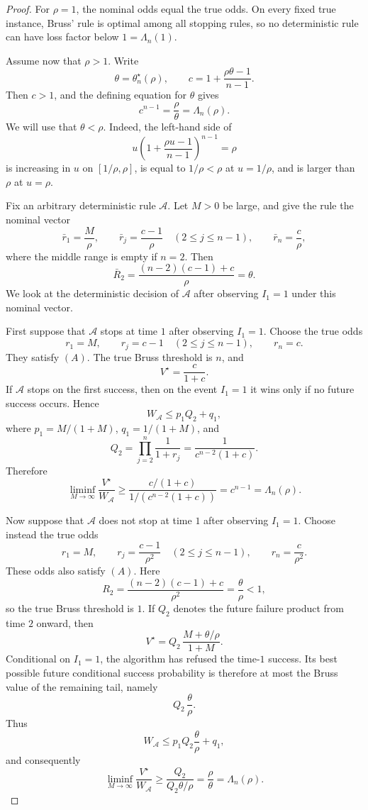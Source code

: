 \documentclass[11pt,a4paper]{article}
\begin{document}
\begin{proof}
For \(\rho=1\), the nominal odds equal the true odds.  On every fixed true
instance, Bruss' rule is optimal among all stopping rules, so no deterministic
rule can have loss factor below \(1=\Lambda_n(1)\).

Assume now that \(\rho>1\).  Write
\[
  \theta=\theta_n^\star(\rho),
  \qquad
  c=1+\frac{\rho\theta-1}{n-1}.
\]
Then \(c>1\), and the defining equation for \(\theta\) gives
\[
  c^{n-1}=\frac{\rho}{\theta}=\Lambda_n(\rho).
\]
We will use that \(\theta<\rho\).  Indeed, the left-hand side of
\[
  u\left(1+\frac{\rho u-1}{n-1}\right)^{n-1}=\rho
\]
is increasing in \(u\) on \([1/\rho,\rho]\), is equal to \(1/\rho<\rho\) at
\(u=1/\rho\), and is larger than \(\rho\) at \(u=\rho\).

Fix an arbitrary deterministic rule \(\mathcal A\).  Let \(M>0\) be large, and
give the rule the nominal vector
\[
  \bar r_1=\frac{M}{\rho},
  \qquad
  \bar r_j=\frac{c-1}{\rho}\quad(2\le j\le n-1),
  \qquad
  \bar r_n=\frac{c}{\rho},
\]
where the middle range is empty if \(n=2\).  Then
\[
  \bar R_2
  =
  \frac{(n-2)(c-1)+c}{\rho}
  =
  \theta.
\]
We look at the deterministic decision of \(\mathcal A\) after observing
\(I_1=1\) under this nominal vector.

First suppose that \(\mathcal A\) stops at time \(1\) after observing
\(I_1=1\).  Choose the true odds
\[
  r_1=M,
  \qquad
  r_j=c-1\quad(2\le j\le n-1),
  \qquad
  r_n=c.
\]
They satisfy \((A)\).  The true Bruss threshold is \(n\), and
\[
  V^\star=\frac{c}{1+c}.
\]
If \(\mathcal A\) stops on the first success, then on the event \(I_1=1\) it
wins only if no future success occurs.  Hence
\[
  W_{\mathcal A}\le p_1Q_2+q_1,
\]
where \(p_1=M/(1+M)\), \(q_1=1/(1+M)\), and
\[
  Q_2=\prod_{j=2}^n\frac1{1+r_j}
      =\frac1{c^{n-2}(1+c)}.
\]
Therefore
\[
  \liminf_{M\to\infty}
  \frac{V^\star}{W_{\mathcal A}}
  \ge
  \frac{c/(1+c)}{1/(c^{n-2}(1+c))}
  =
  c^{n-1}
  =
  \Lambda_n(\rho).
\]

Now suppose that \(\mathcal A\) does not stop at time \(1\) after observing
\(I_1=1\).  Choose instead the true odds
\[
  r_1=M,
  \qquad
  r_j=\frac{c-1}{\rho^2}\quad(2\le j\le n-1),
  \qquad
  r_n=\frac{c}{\rho^2}.
\]
These odds also satisfy \((A)\).  Here
\[
  R_2=\frac{(n-2)(c-1)+c}{\rho^2}
      =
      \frac{\theta}{\rho}
      <1,
\]
so the true Bruss threshold is \(1\).  If \(Q_2\) denotes the future failure
product from time \(2\) onward, then
\[
  V^\star
  =
  Q_2\,\frac{M+\theta/\rho}{1+M}.
\]
Conditional on \(I_1=1\), the algorithm has refused the time-\(1\) success.  Its
best possible future conditional success probability is therefore at most the
Bruss value of the remaining tail, namely
\[
  Q_2\,\frac{\theta}{\rho}.
\]
Thus
\[
  W_{\mathcal A}
  \le
  p_1Q_2\frac{\theta}{\rho}+q_1,
\]
and consequently
\[
  \liminf_{M\to\infty}
  \frac{V^\star}{W_{\mathcal A}}
  \ge
  \frac{Q_2}{Q_2\theta/\rho}
  =
  \frac{\rho}{\theta}
  =
  \Lambda_n(\rho).
\]


\end{proof}
\end{document}
